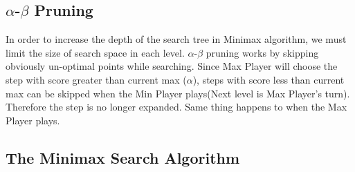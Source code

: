 \documentclass[conference]{IEEEtran}
\begin{document}
\subsection{$\alpha$-$\beta$ Pruning}
In order to increase the depth of the search tree in Minimax algorithm, we must limit the size of search space in each level. $\alpha$-$\beta$ pruning works by skipping obviously un-optimal points while searching. Since Max Player will choose the step with score greater than current max ($\alpha$), steps with score less than current max can be skipped when the Min Player plays(Next level is Max Player's turn). Therefore the step is no longer expanded. Same thing happens to when the Max Player plays.




\subsection{The Minimax Search Algorithm}
\end{document}
